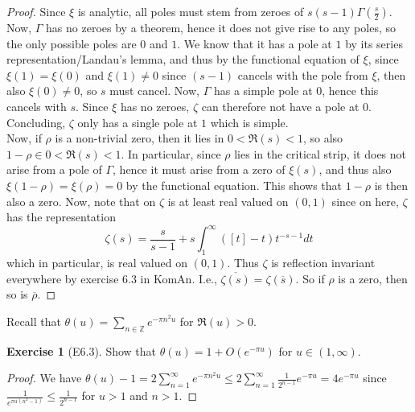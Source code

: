 \documentclass[reqno]{amsart}
\theoremstyle{definition}
\newtheorem{exercise}[theorem]{Exercise}
\theoremstyle{remark}
\begin{document}
\begin{proof}
    Since $\xi$ is analytic, all poles must
    stem from zeroes of
    $s(s-1) \Gamma (\frac{s}{2})$. Now,
    $\Gamma$ has no zeroes by a theorem, hence
    it does not give rise to any poles, so the only
    possible poles are
    $0$ and $1$. We know that it has
    a pole at $1$ by its series representation/Landau's lemma, and
    thus by the functional equation of
    $\xi$, since
    $\xi(1) = \xi(0)$ and
    $\xi(1) \neq 0$ since $(s-1)$ cancels with the
    pole from $\xi$, then also
    $\xi(0)\neq 0$, so
    $s$ must cancel. Now, $\Gamma$ has a simple pole at $0$, hence
    this cancels with  $s$.
    Since $\xi$ has no zeroes, $\zeta$ can therefore not
    have a pole at $0$.\\
    Concluding, $\zeta$ only has a single pole at $1$ which
    is simple.\\
    \linebreak
    Now, if $\rho$ is a non-trivial zero,
    then it lies in
    $0 < \Re (s) < 1$, so also
    $1 - \rho \in 0 < \Re (s) < 1$. 
    In particular, since $\rho$ lies in the critical
    strip, it does not arise from a pole
    of $\Gamma$, hence it must arise from a zero
    of $\xi (s)$, and thus also
    $\xi \left( 1- \rho  \right) = \xi(\rho) = 0$ by the
    functional equation. This shows that
    $1- \rho $ is then also a zero. 
    Now, note that
    on $\zeta$ is at least real valued
    on $\left( 0,1 \right) $ since
    on here, $\zeta$ has the representation
    \[
    \zeta(s) = \frac{s}{s-1} + 
    s \int_{1}^{\infty} \left( \left[ t \right] - t \right) 
    t^{-s-1} dt
    \] 
    which in particular, is real valued on
    $(0,1)$.
    Thus $\zeta$ is reflection invariant everywhere by
    exercise 6.3 in KomAn. I.e.,
    $\overline{\zeta(s)}
    = \zeta\left( \overline{s} \right) $. 
    So if $\rho $ is a zero, then
    so is $\overline{\rho }$.
\end{proof}

Recall that
$\theta (u) = 
\sum_{n \in \mathbb{Z}}
e^{-\pi n^2 u}$ for $\Re (u) > 0$.

\begin{exercise}[E6.3]
    Show that $\theta (u) = 1 + O \left( e^{-\pi u} \right) $ 
    for $u \in (1, \infty)$.
\end{exercise}

\begin{proof}
    We have
    $\theta (u) - 1 = 2 \sum_{n =1}^{\infty}
    e^{- \pi n^2 u}
    \le 2 \sum_{n=1}^{\infty}\frac{1}{2^{n-1}} e^{-\pi u}
    = 4 e^{- \pi u}$ since
    $\frac{1}{e^{\pi u (n^2 -1)}}
    \le \frac{1}{2^{n-1}}$ for $u>1$ and
    $n>1$.
\end{proof}
\end{document}
